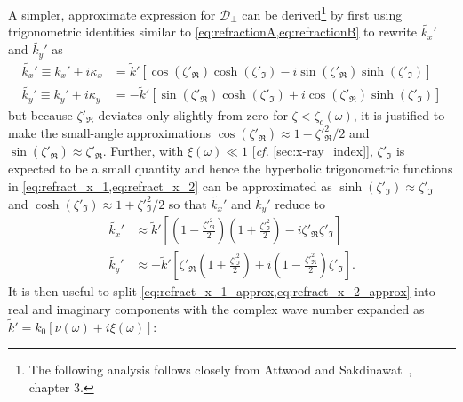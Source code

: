A simpler, approximate expression for $\mathcal{D}_{\perp}$ can be derived\footnote{The following analysis follows closely from Attwood and Sakdinawat~\cite{Attwood17}, chapter 3.} by first using trigonometric identities similar to \cref{eq:refractionA,eq:refractionB} to rewrite $\tilde{k_x}'$ and $\tilde{k_y}'$ as 
\begin{subequations}
\begin{align}
 \tilde{k_x}' \equiv k_x' + i \kappa_x &= \tilde{k}' \left[ \cos \left( \zeta'_{\Re} \right) \cosh \left( \zeta'_{\Im} \right) - i \sin \left( \zeta'_{\Re} \right) \sinh \left( \zeta'_{\Im} \right) \right] \label{eq:refract_x_1} \\ 
 \tilde{k_y}' \equiv k_y' + i \kappa_y &= - \tilde{k}' \left[ \sin \left( \zeta'_{\Re} \right) \cosh \left( \zeta'_{\Im} \right) + i \cos \left( \zeta'_{\Re} \right) \sinh \left( \zeta'_{\Im} \right) \right] \label{eq:refract_x_2} 
 \end{align}
\end{subequations}
but because $\zeta'_{\Re}$ deviates only slightly from zero for $\zeta < \zeta_c (\omega)$, it is justified to make the small-angle approximations $\cos \left( \zeta'_{\Re} \right) \approx 1 - \zeta'^2_{\Re} / 2$ and $\sin \left( \zeta'_{\Re} \right) \approx \zeta'_{\Re}$. 
Further, with $\xi (\omega) \ll 1$ [\emph{cf.\@} \cref{sec:x-ray_index}], $\zeta'_{\Im}$ is expected to be a small quantity and hence the hyperbolic trigonometric functions in \cref{eq:refract_x_1,eq:refract_x_2} can be approximated as $\sinh \left( \zeta'_{\Im} \right) \approx \zeta'_{\Im}$ and $\cosh \left( \zeta'_{\Im} \right) \approx 1 + \zeta'^2_{\Im}/2$ so that $\tilde{k_x}'$ and $\tilde{k_y}'$ reduce to \cite{Attwood17}
\begin{subequations}
\begin{align}
 \tilde{k_x}' &\approx \tilde{k}' \left[\left( 1 - \frac{\zeta'^2_{\Re}}{2} \right) \left( 1 + \frac{\zeta'^2_{\Im}}{2} \right) - i \zeta'_{\Re} \zeta'_{\Im} \right] \label{eq:refract_x_1_approx} \\
 \tilde{k_y}' &\approx - \tilde{k}' \left[ \zeta'_{\Re} \left( 1 + \frac{\zeta'^2_{\Im}}{2} \right) + i \left( 1 - \frac{\zeta'^2_{\Re}}{2} \right) \zeta'_{\Im} \right]\label{eq:refract_x_2_approx} .
 \end{align} 
\end{subequations}
It is then useful to split \cref{eq:refract_x_1_approx,eq:refract_x_2_approx} into real and imaginary components with the complex wave number expanded as $\tilde{k}' = k_0 \left[ \nu(\omega) + i \xi (\omega) \right]$: 
